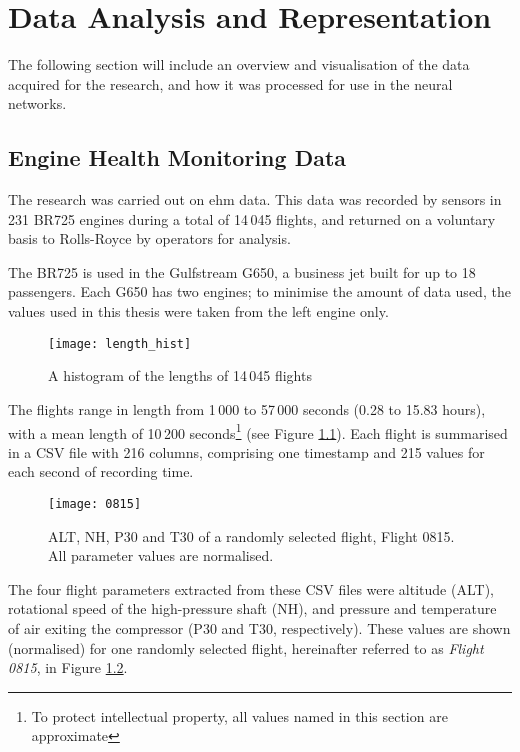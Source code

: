 \chapter{Data Analysis and Representation}
The following section will include an overview and visualisation of the data acquired for the research, and how it was processed for use in the neural networks.

\section{Engine Health Monitoring Data} \label{sec:ehm}
The research was carried out on \ac{ehm} data. This data was recorded by sensors in 231 BR725 engines during a total of 14\,045 flights, and returned on a voluntary basis to Rolls-Royce by operators for analysis.

The BR725 is used in the Gulfstream G650, a business jet built for up to 18 passengers. Each G650 has two engines; to minimise the amount of data used, the values used in this thesis were taken from the left engine only.

\begin{figure}[tb!]
    \centering
    \texttt{[image: length\_hist]}
    \caption{\label{fig:flight_len} A histogram of the lengths of 14\,045 flights}
\end{figure}

The flights range in length from 1\,000 to 57\,000 seconds (0.28 to 15.83 hours), with a mean length of 10\,200 seconds\footnote{To protect intellectual property, all values named in this section are approximate} (see Figure \ref{fig:flight_len}). Each flight is summarised in a CSV file with 216 columns, comprising one timestamp and 215 values for each second of recording time.

\begin{figure}[tb!]
    \centering
    \texttt{[image: 0815]}
    \caption{\label{fig:flight_example} ALT, NH, P30 and T30 of a randomly selected flight, Flight 0815. All parameter values are normalised.}
\end{figure}

The four flight parameters extracted from these CSV files were altitude (ALT), rotational speed of the high-pressure shaft (NH), and pressure and temperature of air exiting the compressor (P30 and T30, respectively). These values are shown (normalised) for one randomly selected flight, hereinafter referred to as \textit{Flight 0815}, in Figure \ref{fig:flight_example}.

